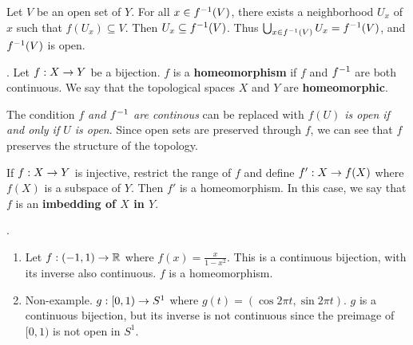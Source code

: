  Let \(V\) be an open set of \(Y\). For all \(x \in f^{-1}(V)\), there exists a neighborhood \(U_x\) of \(x\) such that \(f(U_x) \subseteq V\). Then \(U_x \subseteq f^{-1}(V)\). Thus \(\bigcup_{x \in f^{-1}(V)} U_x = f^{-1}(V)\), and \(f^{-1}(V)\) is open.

.  Let \(f: X \rightarrow Y\) be a bijection. \(f\) is a \textbf{homeomorphism} if \(f\) and \(f^{-1}\) are both continuous. We say that the topological spaces \(X\) and \(Y\) are \textbf{homeomorphic}.

\rmk The condition \textit{\(f\) and \(f^{-1}\) are continous} can be replaced with \textit{\(f(U)\) is open if and only if \(U\) is open}. Since open sets are preserved through \(f\), we can see that \(f\) preserves the structure of the topology.

\rmk If \(f : X \rightarrow Y\) is injective, restrict the range of \(f\) and define \(f': X \rightarrow f(X)\) where \(f(X)\) is a subspace of \(Y\). Then \(f'\) is a homeomorphism. In this case, we say that \(f\) is an \textbf{imbedding of \(X\) in \(Y\)}.

\ex.
\begin{enumerate}
    \item Let \(f: (-1, 1) \rightarrow \mathbb{R}\) where \(f(x) = \frac{x}{1-x^2}\). This is a continuous bijection, with its inverse also continuous. \(f\) is a homeomorphism.
    \item Non-example. \(g : [0, 1) \rightarrow S^1\) where \(g(t) = (\cos 2\pi t, \sin 2\pi t)\). \(g\) is a continuous bijection, but its inverse is not continuous since the preimage of \([0, 1)\) is not open in \(S^1\).
\end{enumerate}


\pagebreak
